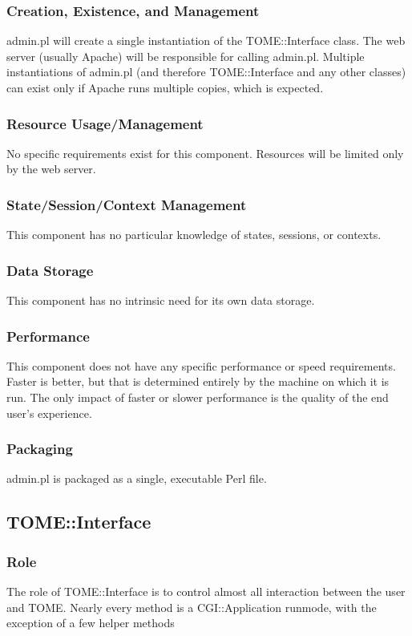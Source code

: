 \documentclass[12pt,titlepage]{article}
\begin{document}
\subsubsection{Creation, Existence, and Management}
admin.pl will create a single instantiation of the TOME::Interface class.  The web server (usually Apache) will be responsible for calling admin.pl.  Multiple instantiations of admin.pl (and therefore TOME::Interface and any other classes) can exist only if Apache runs multiple copies, which is expected.
\subsubsection{Resource Usage/Management}
No specific requirements exist for this component.  Resources will be limited only by the web server.
\subsubsection{State/Session/Context Management}
This component has no particular knowledge of states, sessions, or contexts.
\subsubsection{Data Storage}
This component has no intrinsic need for its own data storage.
\subsubsection{Performance}
This component does not have any specific performance or speed requirements.  Faster is better, but that is determined entirely by the machine on which it is run.  The only impact of faster or slower performance is the quality of the end user's experience.
\subsubsection{Packaging}
admin.pl is packaged as a single, executable Perl file.


\subsection{TOME::Interface}
\subsubsection{Role}
The role of TOME::Interface is to control almost all interaction between the user and TOME. Nearly every method is a CGI::Application runmode, with the exception of a few helper methods
\end{document}
